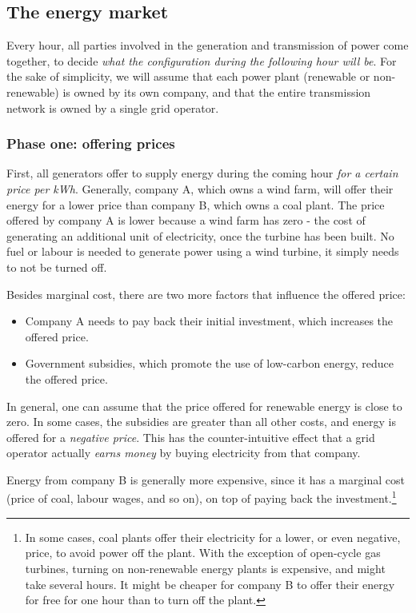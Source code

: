 \documentclass[main.tex]{subfiles}
\begin{document}


\clearpage
\subsection{The energy market}
Every hour, all parties involved in the generation and transmission of power come together, to decide \emph{what the configuration during the following hour will be}. For the sake of simplicity, we will assume that each power plant (renewable or non-renewable) is owned by its own company, and that the entire transmission network is owned by a single grid operator.

\subsubsection*{Phase one: offering prices}
First, all generators offer to supply energy during the coming hour \emph{for a certain price per kWh}. Generally, company A, which owns a wind farm, will offer their energy for a lower price than company B, which owns a coal plant. The price offered by company A is lower because a wind farm has zero  - the cost of generating an additional unit of electricity, once the turbine has been built. No fuel or labour is needed to generate power using a wind turbine, it simply needs to not be turned off.

Besides marginal cost, there are two more factors that influence the offered price:
\begin{itemize}[itemsep=0em]
    \item Company A needs to pay back their initial investment, which increases the offered price.
    \item Government subsidies, which promote the use of low-carbon energy, reduce the offered price.
\end{itemize}
In general, one can assume that the price offered for renewable energy is close to zero. In some cases, the subsidies are greater than all other costs, and energy is offered for a \emph{negative price}. This has the counter-intuitive effect that a grid operator actually \emph{earns money} by buying electricity from that company.

Energy from company B is generally more expensive, since it has a marginal cost (price of coal, labour wages, and so on), on top of paying back the investment.\footnote{In some cases, coal plants offer their electricity for a lower, or even negative, price, to avoid power off the plant. With the exception of open-cycle gas turbines, turning on non-renewable energy plants is expensive, and might take several hours. It might be cheaper for company B to offer their energy for free for one hour than to turn off the plant.}
\end{document}

